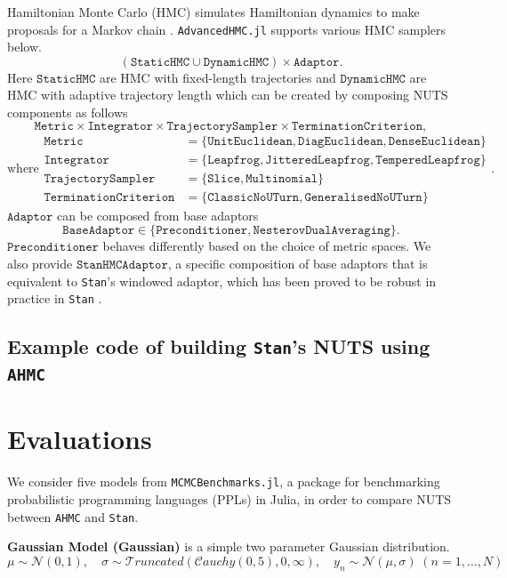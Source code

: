 \documentclass[tablecaption=bottom,wcp]{jmlr} %
\def\ahmc{\texttt{AHMC} }
\def\stan{\texttt{Stan} }
\def\stans{\texttt{Stan}'s }
\begin{document}
Hamiltonian Monte Carlo (HMC) simulates Hamiltonian dynamics to make proposals for a Markov chain \citep{neal2011mcmc}.
\texttt{AdvancedHMC.jl} supports various HMC samplers below.
$$
(\texttt{StaticHMC} \cup \texttt{DynamicHMC}) \times \texttt{Adaptor}.
$$
Here $\texttt{StaticHMC}$ are HMC with fixed-length trajectories and 
$\texttt{DynamicHMC}$ are HMC with adaptive trajectory length 
which can be created by composing NUTS components as follows
$$
\texttt{Metric} \times \texttt{Integrator} \times \texttt{TrajectorySampler} \times \texttt{TerminationCriterion},
$$
\begin{equation*}
\text{where}
    \begin{aligned} 
        \texttt{Metric} &=  \{ \texttt{UnitEuclidean}, \texttt{DiagEuclidean}, \texttt{DenseEuclidean} \} \\ 
        \texttt{Integrator} &=  \{ \texttt{Leapfrog}, \texttt{JitteredLeapfrog}, \texttt{TemperedLeapfrog} \} \\
        \texttt{TrajectorySampler} &=  \{ \texttt{Slice}, \texttt{Multinomial} \} \\
        \texttt{TerminationCriterion} &= \{ \texttt{ClassicNoUTurn}, \texttt{GeneralisedNoUTurn} \}
    \end{aligned}.
\end{equation*}
$\texttt{Adaptor}$ can be composed from base adaptors
$$
\texttt{BaseAdaptor} \in \{\texttt{Preconditioner}, \texttt{NesterovDualAveraging}\}.
$$
$\texttt{Preconditioner}$ behaves differently based on the choice of metric spaces. We also provide $\texttt{StanHMCAdaptor}$, a specific composition of base adaptors that is equivalent to \stans windowed adaptor, which has been proved to be robust in practice in \stan.

\subsection{Example code of building \stans NUTS using \ahmc}


\section{Evaluations}
We consider five models from \texttt{MCMCBenchmarks.jl}, a package for benchmarking probabilistic programming languages (PPLs) in Julia, in order to compare 
NUTS between \ahmc and \texttt{Stan}.

\textbf{Gaussian Model (Gaussian)}
is a simple two parameter Gaussian distribution.
$$
\mu \sim \mathcal{N}(0, 1), \quad 
\sigma \sim \mathcal{T}runcated(\mathcal{C}auchy(0, 5), 0, \infty), \quad
y_n \sim \mathcal{N}(\mu, \sigma) \; (n = 1, \dots, N)
$$
\end{document}
